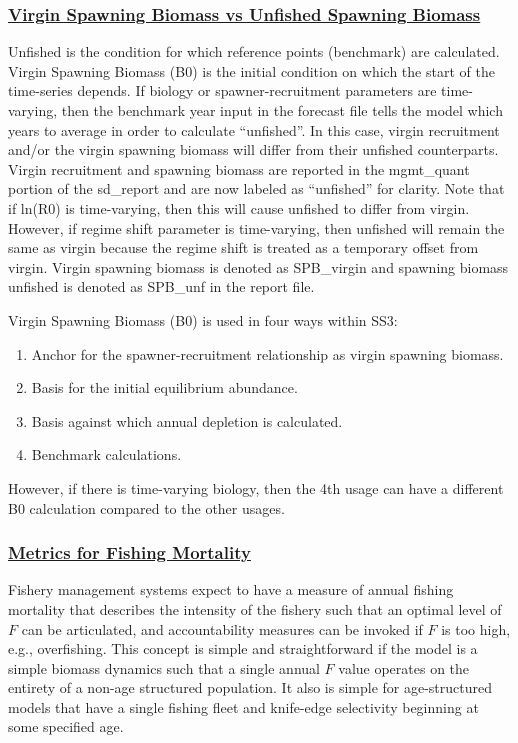 \subsubsection[Virgin Spawning Biomass vs Unfished Spawning Biomass]{\protect\hyperlink{VirginUnfished}{Virgin Spawning Biomass vs Unfished Spawning Biomass}}
Unfished is the condition for which reference points (benchmark) are calculated. Virgin Spawning Biomass (B0) is the initial condition on which the start of the time-series depends. If biology or spawner-recruitment parameters are time-varying, then the benchmark year input in the forecast file tells the model which years to average in order to calculate ``unfished''. In this case, virgin recruitment and/or the virgin spawning biomass will differ from their unfished counterparts. Virgin recruitment and spawning biomass are reported in the mgmt\_quant portion of the sd\_report and are now labeled as ``unfished'' for clarity. Note that if ln(R0) is time-varying, then this will cause unfished to differ from virgin. However, if regime shift parameter is time-varying, then unfished will remain the same as virgin because the regime shift is treated as a temporary offset from virgin. Virgin spawning biomass is denoted as SPB\_virgin and spawning biomass unfished is denoted as SPB\_unf in the report file.

Virgin Spawning Biomass (B0) is used in four ways within SS3:
\begin{enumerate}
	\item Anchor for the spawner-recruitment relationship as virgin spawning biomass.
	\item Basis for the initial equilibrium abundance. 
	\item Basis against which annual depletion is calculated.
	\item Benchmark calculations.
\end{enumerate}
However, if there is time-varying biology, then the 4th usage can have a different B0 calculation compared to the other usages.

\hypertarget{FMortality}{}
\subsubsection[Metrics for Fishing Mortality]{\protect\hyperlink{FMortality}{Metrics for Fishing Mortality}}
Fishery management systems expect to have a measure of annual fishing mortality that describes the intensity of the fishery such that an optimal level of $F$ can be articulated, and accountability measures can be invoked if $F$ is too high, e.g., overfishing. This concept is simple and straightforward if the model is a simple biomass dynamics such that a single annual $F$ value operates on the entirety of a non-age structured population. It also is simple for age-structured models that have a single fishing fleet and knife-edge selectivity beginning at some specified age.

